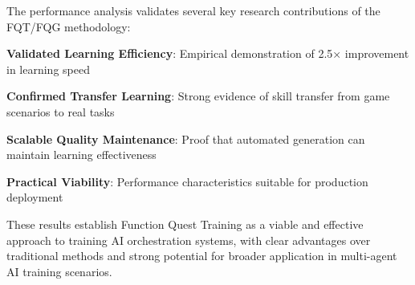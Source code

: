 The performance analysis validates several key research contributions of the FQT/FQG methodology:

\begin{expandedlist}
    \item \textbf{Validated Learning Efficiency}: Empirical demonstration of 2.5× improvement in learning speed
    \item \textbf{Confirmed Transfer Learning}: Strong evidence of skill transfer from game scenarios to real tasks
    \item \textbf{Scalable Quality Maintenance}: Proof that automated generation can maintain learning effectiveness
    \item \textbf{Practical Viability}: Performance characteristics suitable for production deployment
\end{expandedlist}

These results establish Function Quest Training as a viable and effective approach to training AI orchestration systems, with clear advantages over traditional methods and strong potential for broader application in multi-agent AI training scenarios.
